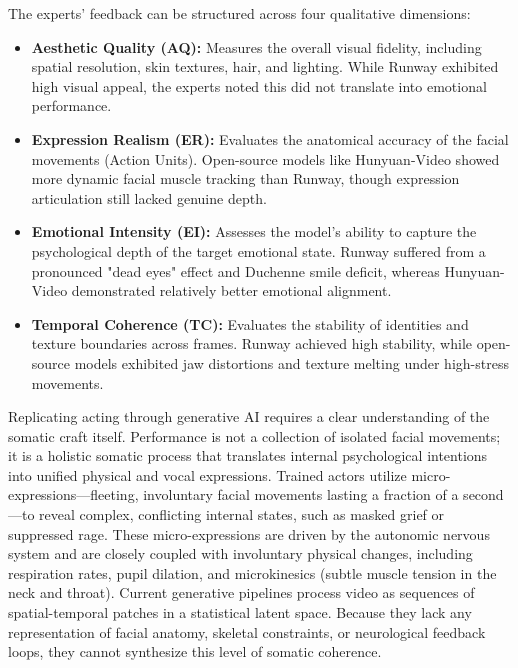 \documentclass[pdflatex,sn-mathphys-num]{sn-jnl}
\theoremstyle{thmstyleone}
\theoremstyle{thmstyletwo}
\theoremstyle{thmstylethree}
\begin{document}
The experts' feedback can be structured across four qualitative dimensions:
\begin{itemize}
    \item \textbf{Aesthetic Quality (AQ):} Measures the overall visual fidelity, including spatial resolution, skin textures, hair, and lighting. While Runway exhibited high visual appeal, the experts noted this did not translate into emotional performance.
    \item \textbf{Expression Realism (ER):} Evaluates the anatomical accuracy of the facial movements (Action Units). Open-source models like Hunyuan-Video showed more dynamic facial muscle tracking than Runway, though expression articulation still lacked genuine depth.
    \item \textbf{Emotional Intensity (EI):} Assesses the model's ability to capture the psychological depth of the target emotional state. Runway suffered from a pronounced "dead eyes" effect and Duchenne smile deficit, whereas Hunyuan-Video demonstrated relatively better emotional alignment.
    \item \textbf{Temporal Coherence (TC):} Evaluates the stability of identities and texture boundaries across frames. Runway achieved high stability, while open-source models exhibited jaw distortions and texture melting under high-stress movements.
\end{itemize}

Replicating acting through generative AI requires a clear understanding of the somatic craft itself. Performance is not a collection of isolated facial movements; it is a holistic somatic process that translates internal psychological intentions into unified physical and vocal expressions. Trained actors utilize micro-expressions—fleeting, involuntary facial movements lasting a fraction of a second—to reveal complex, conflicting internal states, such as masked grief or suppressed rage. These micro-expressions are driven by the autonomic nervous system and are closely coupled with involuntary physical changes, including respiration rates, pupil dilation, and microkinesics (subtle muscle tension in the neck and throat). Current generative pipelines process video as sequences of spatial-temporal patches in a statistical latent space. Because they lack any representation of facial anatomy, skeletal constraints, or neurological feedback loops, they cannot synthesize this level of somatic coherence.
\end{document}
